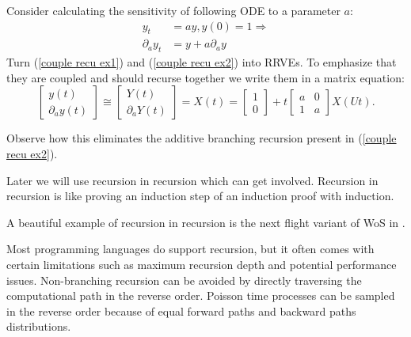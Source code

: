 \documentclass[a4paper,12pt]{article}
\begin{document}
\begin{example} \label{ex:coupled recursion}
  Consider calculating the
  sensitivity of following ODE to a
  parameter $a$:
  \begin{align}
    y_t             & =ay,y(0)=1 \Rightarrow \label{couple recu ex1} \\
    \partial_{a}y_t & = y + a \partial_{a}y \label{couple recu ex2}
  \end{align}
  Turn (\ref{couple recu ex1}) and (\ref{couple recu ex2}) into RRVEs.
  To emphasize that they are coupled and should
  recurse together we write them in a matrix equation:
  \begin{equation} \label{coupled mat}
    \begin{bmatrix}
      y(t) \\
      \partial_{a}y(t)
    \end{bmatrix} \cong
    \begin{bmatrix}
      Y(t) \\
      \partial_{a}Y(t)
    \end{bmatrix}=
    X(t)=
    \begin{bmatrix}
      1 \\
      0
    \end{bmatrix}+
    t \begin{bmatrix}
      a & 0 \\
      1 & a
    \end{bmatrix}
    X(Ut).
  \end{equation}

  Observe how this eliminates the additive branching recursion
  present in (\ref{couple recu ex2}).

\end{example}


\begin{technique}\label{tech:recu in recu}
  Later we will use recursion in recursion which can get involved.
  Recursion in recursion is like proving an induction
  step of an induction proof with induction.
\end{technique}

\begin{related}
  A beautiful example of recursion in recursion is
  the next flight variant of WoS in
  \cite{sawhney_grid-free_2022}.
\end{related}

Most programming languages do support recursion, but it often comes with certain
limitations such as maximum recursion depth and potential performance issues.
Non-branching recursion can be avoided by directly traversing the computational path in the
reverse order. Poisson time processes can be sampled in the reverse order
because of equal forward paths and backward paths distributions.
\end{document}
